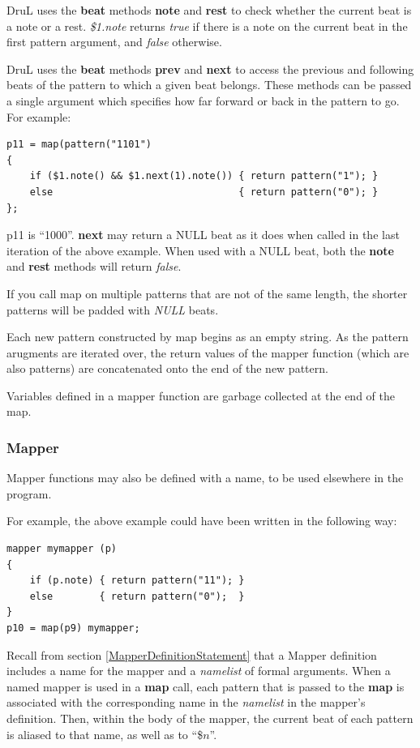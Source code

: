 \documentclass[11pt,twoside]{article}
\begin{document}
DruL uses the \textbf{beat} methods \textbf{note} and \textbf{rest} to check whether
the current beat is a note or a rest.  
\textit{\$1.note} returns \textit{true} if there is a note on the current beat in the first pattern argument, and \textit{false} otherwise.

DruL uses the \textbf{beat} methods \textbf{prev} and \textbf{next} to access the previous and following beats of the pattern to which a given beat belongs. These methods can be passed a single argument which specifies how far forward or back in the pattern to go.  For example:
\begin{verbatim}
p11 = map(pattern("1101")
{
    if ($1.note() && $1.next(1).note()) { return pattern("1"); }
    else                                { return pattern("0"); }
};
\end{verbatim}
p11 is ``1000''.  \textbf{next} may return a NULL beat as it does when called in the last iteration of the above example.  When used with a NULL beat, both the \textbf{note} and \textbf{rest} methods will return \textit{false}.  

If you call map on multiple patterns that are not of the same length, the shorter patterns will be padded with \textit{NULL} beats.

Each new pattern constructed by map begins as an empty string.  As the pattern arugments are iterated over, the return values of the mapper function (which are also patterns) are concatenated onto the end of the new pattern.

Variables defined in a mapper function are garbage collected at the end of the map.

\subsubsection{Mapper}\label{MapSection}

Mapper functions may also be defined with a name, to be used elsewhere in the program.

For example, the above example could have been written in the following way:
\begin{verbatim}
mapper mymapper (p)
{
    if (p.note) { return pattern("11"); }
    else        { return pattern("0");  }
}
p10 = map(p9) mymapper;
\end{verbatim}

Recall from section \ref{MapperDefinitionStatement} that a  Mapper definition includes a name for the mapper and  a \emph{namelist} of formal arguments.
When a named mapper is used in a \textbf{map} call, each pattern that is passed to the \textbf{map} is associated with the corresponding name in the \emph{namelist} in the mapper's definition.
Then, within the body of the mapper, the current beat of each pattern is aliased to that name, as well as to ``\$$n$''.
\end{document}
